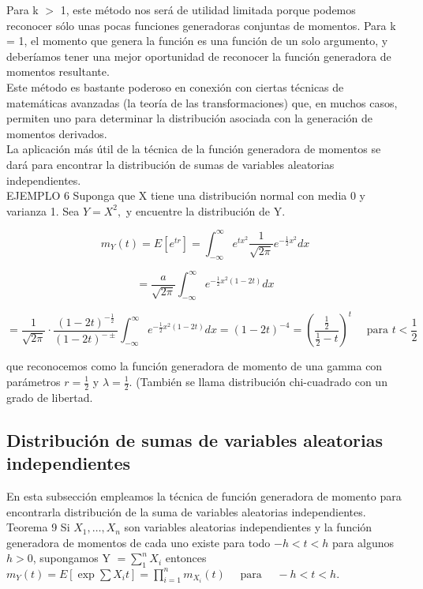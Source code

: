 Para k $>$ 1, este método nos será de utilidad limitada porque podemos reconocer sólo unas pocas funciones generadoras conjuntas de momentos. Para k = 1, el momento que genera la función es una función de un solo argumento, y deberíamos tener una mejor oportunidad de reconocer la función generadora de momentos resultante.\\

Este método es bastante poderoso en conexión con ciertas técnicas de matemáticas avanzadas (la teoría de las transformaciones) que, en muchos casos, permiten uno para determinar la distribución asociada con la generación de momentos derivados.\\

La aplicación más útil de la técnica de la función generadora de momentos se dará para encontrar la distribución de sumas de variables aleatorias independientes.\\

EJEMPLO 6 Suponga que X tiene una distribución normal con media 0 y varianza 1. Sea  $Y=X^{2},$  y encuentre la distribución de Y.
\begin{center}
$$
m_{Y}(t) =E\left[e^{t r}\right]=\int_{-\infty}^{\infty} e^{t x^{2}} \frac{1}{\sqrt{2 \pi}} e^{-\frac{1}{2} x^{2}} d x
$$

$$
={\frac{a}{\sqrt{2 \pi}} } \int_{-\infty}^{\infty} e^{-\frac{1}{2} x^{2}(1-2 t)} d x
$$

$$
={\frac{1}{\sqrt{2 \pi}}} \cdot \frac{(1-2 t)^{-\frac{1}{2}}}{(1-2 t)^{-\pm}} \int_{-\infty}^{\infty} e^{-\frac{1}{2} x^{2}(1-2 t)} d x
=(1-2 t)^{-4}=\left(\frac{\frac{1}{2}}{\frac{1}{2}-t}\right)^{t} \quad \text { para } t<\frac{1}{2}
$$

\end{center}
que reconocemos como la función generadora de momento de una gamma con parámetros $r=\frac{1}{2}$ y $\lambda=\frac{1}{2} .$ (También se llama distribución chi-cuadrado con un grado de libertad.
\subsection{Distribución de sumas de variables aleatorias independientes}

En esta subsección empleamos la técnica de función generadora de momento para encontrarla distribución de la suma de variables aleatorias independientes.\\

Teorema 9 Si $X_{1}, \ldots, X_{n}$ son variables aleatorias independientes y la función generadora de momentos de cada uno existe para todo $-h<t<h$ para algunos $h>0$, supongamos Y $=\sum_{1}^{n} X_{i}$ entonces $m_{Y}(t)= E\left[\exp \sum X_{i} t\right]=\prod_{i=1}^{n} m_{X_{i}}(t) \quad \text { para } \quad-h<t<h .$\\

